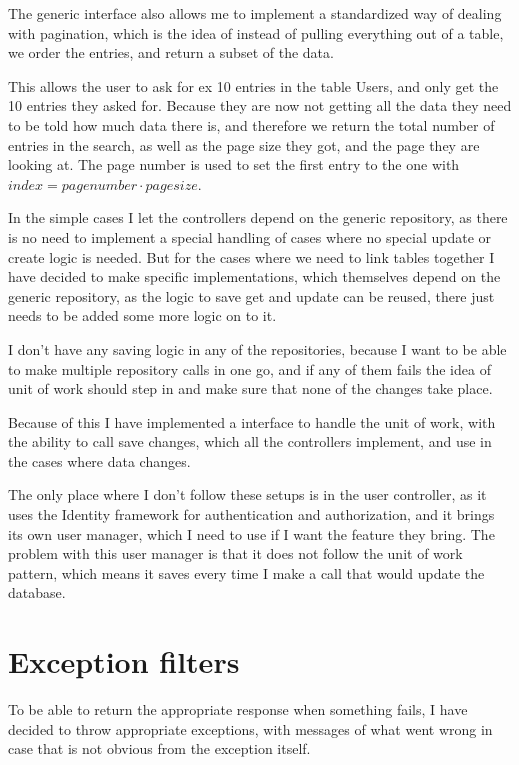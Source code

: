 The generic interface also allows me to implement a standardized way of dealing
with pagination, which is the idea of instead of pulling everything out of a
table, we order the entries, and return a subset of the data. 

This allows the user to ask for ex 10 entries in the table Users, and only get
the 10 entries they asked for. Because they are now not getting all the data
they need to be told how much data there is, and therefore we return the total
number of entries in the search, as well as the page size they got, and the page
they are looking at. The page number is used to set the first entry to the one
with $index = page number \cdot page size$. 

In the simple cases I let the controllers depend on the generic repository, as
there is no need to implement a special handling of cases where no special
update or create logic is needed. But for the cases where we need to link tables
together I have decided to make specific implementations, which themselves
depend on the generic repository, as the logic to save get and update can be
reused, there just needs to be added some more logic on to it. 

I don't have any saving logic in any of the repositories, because I want to be
able to make multiple repository calls in one go, and if any of them fails the
idea of unit of work should step in and make sure that none of the changes take
place. 

Because of this I have implemented a interface to handle the unit of work, with
the ability to call save changes, which all the controllers implement, and use
in the cases where data changes. 

The only place where I don't follow these setups is in the user controller, as
it uses the Identity framework for authentication and authorization, and it
brings its own user manager, which I need to use if I want the feature they
bring. The problem with this user manager is that it does not follow the unit of
work pattern, which means it saves every time I make a call that would update
the database. 

\section{Exception filters}
\label{sec:Exception filters}
To be able to return the appropriate response when something fails, I have
decided to throw appropriate exceptions, with messages of what went wrong in
case that is not obvious from the exception itself.

